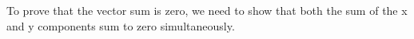 \documentclass[preview]{standalone}
\begin{document}
\begin{center}
To prove that the vector sum is zero, we need to show that both the sum of the x and y components sum to zero simultaneously.
\end{center}
\end{document}

